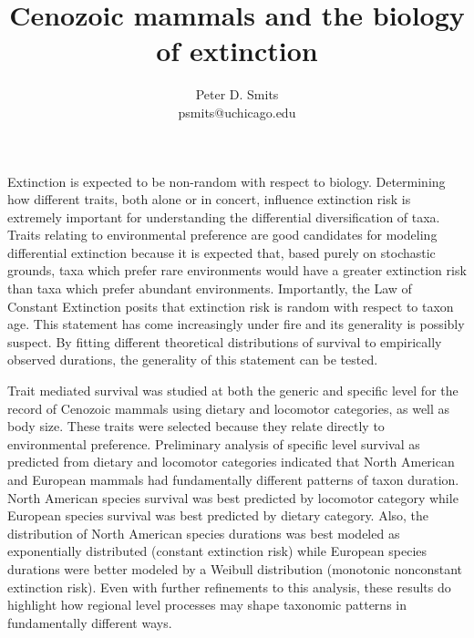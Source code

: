 \documentclass{article}
\title{Cenozoic mammals and the biology of extinction}
\author{Peter D. Smits\\ psmits@uchicago.edu}
\begin{document}
\maketitle

Extinction is expected to be non-random with respect to biology. Determining how different traits, both alone or in concert, influence extinction risk is extremely important for understanding the differential diversification of taxa. Traits relating to environmental preference are good candidates for modeling differential extinction because it is expected that, based purely on stochastic grounds, taxa which prefer rare environments would have a greater extinction risk than taxa which prefer abundant environments. Importantly, the Law of Constant Extinction posits that extinction risk is random with respect to taxon age. This statement has come increasingly under fire and its generality is possibly suspect. By fitting different theoretical distributions of survival to empirically observed durations, the generality of this statement can be tested. 

Trait mediated survival was studied at both the generic and specific level for the record of Cenozoic mammals using dietary and locomotor categories, as well as body size. These traits were selected because they relate directly to environmental preference. Preliminary analysis of specific level survival as predicted from dietary and locomotor categories indicated that North American and European mammals had fundamentally different patterns of taxon duration. North American species survival was best predicted by locomotor category while European species survival was best predicted by dietary category. Also, the distribution of North American species durations was best modeled as exponentially distributed (constant extinction risk) while European species durations were better modeled by a Weibull distribution (monotonic nonconstant extinction risk). Even with further refinements to this analysis, these results do highlight how regional level processes may shape taxonomic patterns in fundamentally different ways.  
\end{document}
